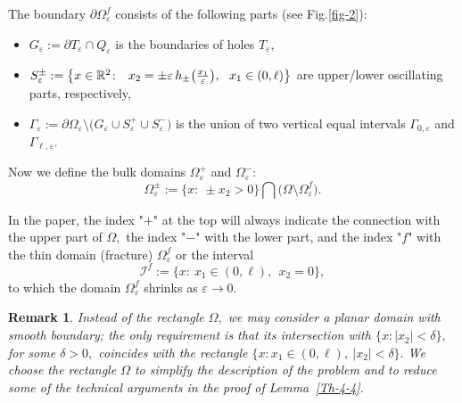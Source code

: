 \documentclass[reqno]{amsart}            %
\newtheorem{remark}{Remark}[section]
\numberwithin{equation}{section}
\begin{document}
	
	
	The boundary $\partial \Omega^f_\varepsilon$ consists of the following parts (see Fig.\ref{fig-2}):
	\begin{itemize}
		\item $G_\varepsilon := \partial T_\varepsilon \cap Q_\varepsilon$ is the boundaries of holes ${T}_\varepsilon,$
		\item $S^\pm_\varepsilon := \big\{x\in \Bbb R^2\colon \ \  x_2 =  \pm \varepsilon\,  h_\pm\big(\frac{x_1}{\varepsilon}\big), \ \  x_1 \in (0, \ell) \big\}$ are upper/lower oscillating parts, respectively,
		\item $\Gamma_\varepsilon := \partial\Omega_\varepsilon \setminus \big(G_\varepsilon \cup S^+_\varepsilon \cup S^-_\varepsilon\big)$ is the union of two vertical equal intervals  $\Gamma_{0,\varepsilon}$ and $\Gamma_{\ell,\varepsilon}.$
	\end{itemize}
	
	Now we define the bulk domains $\Omega^+_\varepsilon$ and $\Omega^-_\varepsilon:$
	$$
	\Omega^\pm_\varepsilon := \{x\colon \ \pm x_2 > 0\} \bigcap \big(\Omega \setminus \Omega^f_\varepsilon\big).
	$$
	
	In the paper, the index  "$+$"  at the top will always indicate the connection with the upper part of $\Omega,$ the index "$-$" with  the lower part,
	and the index "$f$" with the thin domain (fracture) $\Omega^f_\varepsilon$ or the  interval
	$$
	\mathcal{I}^f := \{x\colon\ x_1 \in (0, \ell), \ \ x_2 =0\},
	$$
	to which the domain $\Omega^f_\varepsilon$ shrinks as $\varepsilon \to 0.$
	
	\begin{remark}
	Instead of the rectangle $\Omega,$ we may consider a planar domain with smooth boundary; the only requirement is that its intersection with $\{ x\colon |x_2|<\delta \},$ for some $\delta >0,$ coincides with the rectangle $\{x\colon x_1 \in (0, \ell), \ |x_2| < \delta\}.$
	We choose the rectangle $\Omega$ to simplify the description of the problem and to reduce some of the technical arguments in the proof of Lemma~\ref{Th-4-4}.
	\end{remark}
	
\end{document}
